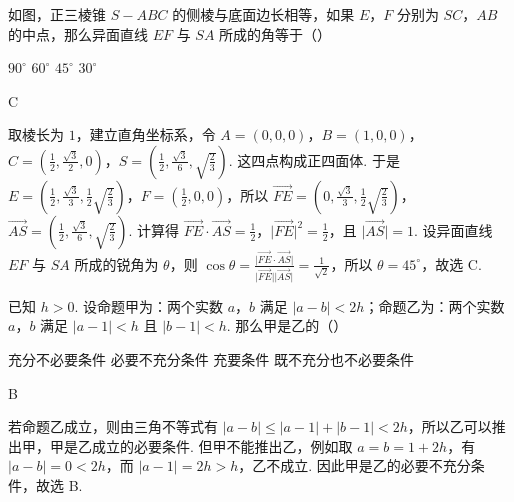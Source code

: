 \documentclass[UTF8,a4paper,oneside,11pt]{ctexbook}
\begin{document}
\begin{problem}
如图，正三棱锥 \(S-ABC\) 的侧棱与底面边长相等，如果 \(E\)，\(F\) 分别为 \(SC\)，\(AB\) 的中点，那么异面直线 \(EF\) 与 \(SA\) 所成的角等于（\quad）


\choices
    {\(90^\circ\)}
    {\(60^\circ\)}
    {\(45^\circ\)}
    {\(30^\circ\)}

\begin{answer}
C
\end{answer}

\begin{solution}
取棱长为 \(1\)，建立直角坐标系，令 \(A=(0,0,0)\)，\(B=(1,0,0)\)，\(C=(\frac{1}{2},\frac{\sqrt{3}}{2},0)\)，\(S=(\frac{1}{2},\frac{\sqrt{3}}{6},\sqrt{\frac{2}{3}})\). 这四点构成正四面体. 于是 \(E=(\frac{1}{2},\frac{\sqrt{3}}{3},\frac{1}{2}\sqrt{\frac{2}{3}})\)，\(F=(\frac{1}{2},0,0)\)，所以 \(\overrightarrow{FE}=(0,\frac{\sqrt{3}}{3},\frac{1}{2}\sqrt{\frac{2}{3}})\)，\(\overrightarrow{AS}=(\frac{1}{2},\frac{\sqrt{3}}{6},\sqrt{\frac{2}{3}})\). 计算得 \(\overrightarrow{FE}\cdot\overrightarrow{AS}=\frac{1}{2}\)，\(\lvert\overrightarrow{FE}\rvert^2=\frac{1}{2}\)，且 \(\lvert\overrightarrow{AS}\rvert=1\). 设异面直线 \(EF\) 与 \(SA\) 所成的锐角为 \(\theta\)，则 \(\cos\theta=\frac{\lvert\overrightarrow{FE}\cdot\overrightarrow{AS}\rvert}{\lvert\overrightarrow{FE}\rvert\lvert\overrightarrow{AS}\rvert}=\frac{1}{\sqrt{2}}\)，所以 \(\theta=45^\circ\)，故选 C.
\end{solution}
\end{problem}

\begin{problem}
已知 \(h>0\). 设命题甲为：两个实数 \(a\)，\(b\) 满足 \(|a-b|<2h\)；命题乙为：两个实数 \(a\)，\(b\) 满足 \(|a-1|<h\) 且 \(|b-1|<h\). 那么甲是乙的（\quad）

\choices
    {充分不必要条件}
    {必要不充分条件}
    {充要条件}
    {既不充分也不必要条件}

\begin{answer}
B
\end{answer}

\begin{solution}
若命题乙成立，则由三角不等式有 \(\lvert a-b\rvert\leqslant\lvert a-1\rvert+\lvert b-1\rvert<2h\)，所以乙可以推出甲，甲是乙成立的必要条件. 但甲不能推出乙，例如取 \(a=b=1+2h\)，有 \(\lvert a-b\rvert=0<2h\)，而 \(\lvert a-1\rvert=2h>h\)，乙不成立. 因此甲是乙的必要不充分条件，故选 B.
\end{solution}
\end{problem}
\end{document}
